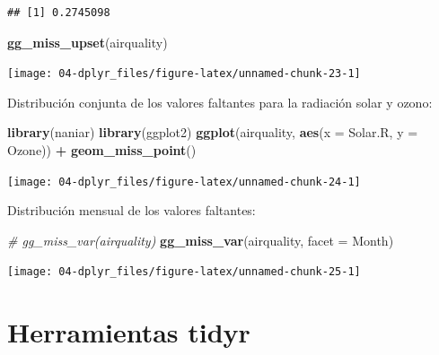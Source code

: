 \documentclass[
]{book}
\newenvironment{Shaded}{\begin{snugshade}}{\end{snugshade}}
\newcommand{\AttributeTok}[1]{\textcolor[rgb]{0.13,0.29,0.53}{#1}}
\newcommand{\CommentTok}[1]{\textcolor[rgb]{0.56,0.35,0.01}{\textit{#1}}}
\newcommand{\FunctionTok}[1]{\textcolor[rgb]{0.13,0.29,0.53}{\textbf{#1}}}
\newcommand{\NormalTok}[1]{#1}
\newcommand{\SpecialCharTok}[1]{\textcolor[rgb]{0.81,0.36,0.00}{\textbf{#1}}}
\begin{document}
\begin{verbatim}
## [1] 0.2745098
\end{verbatim}

\begin{Shaded}
\begin{Highlighting}[]
\FunctionTok{gg\_miss\_upset}\NormalTok{(airquality) }
\end{Highlighting}
\end{Shaded}

\begin{center}\texttt{[image: 04-dplyr\_files/figure-latex/unnamed-chunk-23-1]} \end{center}

Distribución conjunta de los valores faltantes para la radiación solar y ozono:

\begin{Shaded}
\begin{Highlighting}[]
\FunctionTok{library}\NormalTok{(naniar)}
\FunctionTok{library}\NormalTok{(ggplot2)}
\FunctionTok{ggplot}\NormalTok{(airquality, }
       \FunctionTok{aes}\NormalTok{(}\AttributeTok{x =}\NormalTok{ Solar.R, }
           \AttributeTok{y =}\NormalTok{ Ozone)) }\SpecialCharTok{+} 
  \FunctionTok{geom\_miss\_point}\NormalTok{()}
\end{Highlighting}
\end{Shaded}

\begin{center}\texttt{[image: 04-dplyr\_files/figure-latex/unnamed-chunk-24-1]} \end{center}

Distribución mensual de los valores faltantes:

\begin{Shaded}
\begin{Highlighting}[]
\CommentTok{\# gg\_miss\_var(airquality)}
\FunctionTok{gg\_miss\_var}\NormalTok{(airquality, }\AttributeTok{facet =}\NormalTok{ Month)}
\end{Highlighting}
\end{Shaded}

\begin{center}\texttt{[image: 04-dplyr\_files/figure-latex/unnamed-chunk-25-1]} \end{center}

\hypertarget{tidyr-pkg}{%
\section{Herramientas tidyr}\label{tidyr-pkg}}
\end{document}
